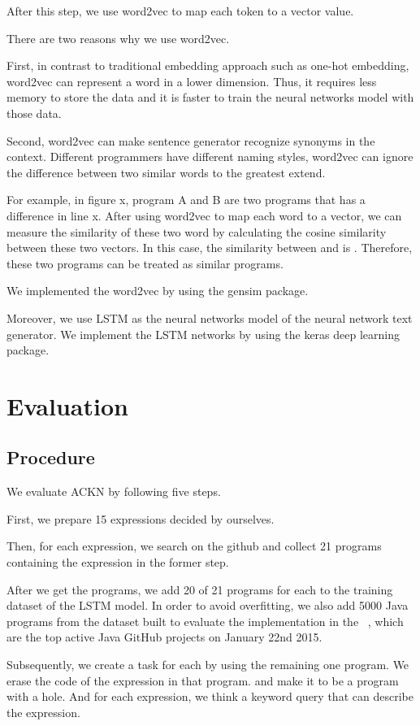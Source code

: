 \documentclass[PRO,english]{ipsj}
\begin{document}
After this step, we use word2vec to map each token to a vector value. 

There are two reasons why we use word2vec. 

First, in contrast to traditional embedding approach such as one-hot embedding, word2vec can represent a word in a lower dimension. Thus, it requires less memory to store the data and it is faster to train the neural networks model with those data. 

Second, word2vec can make sentence generator recognize synonyms in the context. Different programmers have different naming styles, word2vec can ignore the difference between two similar words to the greatest extend. 

For example, in figure x, program A and B are two programs that has a difference in line x. After using word2vec to map each word to a vector, we can measure the similarity of these two word by calculating the cosine similarity between these two vectors. In this case, the similarity between \texttt{} and \texttt{} is . Therefore, these two programs can be treated as similar programs.

We implemented the word2vec by using the gensim package.

Moreover, we use LSTM as the neural networks model of the neural network text generator. We implement the LSTM networks by using the keras deep learning package.

\section{Evaluation}\label{sec:evaluation}
\subsection{Procedure}
We evaluate ACKN by following five steps. 

First, we prepare 15 expressions decided by ourselves. 

Then, for each expression, we search on the github and collect 21 programs containing the expression in the former step.

After we get the programs, we add 20 of 21 programs for each to the training dataset of the LSTM model. In order to avoid overfitting, we also add 5000 Java programs from the dataset built to evaluate the implementation in the ~\cite{allamanis2015suggesting}, which are the top active Java GitHub projects on January 22nd 2015.

Subsequently, we create a task for each by using the remaining one program. We erase the code of the expression in that program. and make it to be a program with a hole. And for each expression, we think a keyword query that can describe the expression. 
\end{document}
